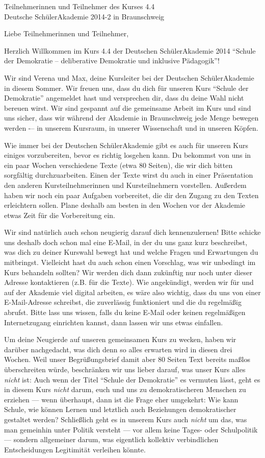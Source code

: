 \documentclass[a4paper]{letter}
\date{15.\ April 2014}
\begin{document}
\begin{letter}{
	Teilnehmerinnen und Teilnehmer des Kurses 4.4 \\
	Deutsche SchülerAkademie 2014-2 in Braunschweig}

\opening{Liebe Teilnehmerinnen und Teilnehmer,}

Herzlich Willkommen im Kurs 4.4 der Deutschen SchülerAkademie 2014 ``Schule der Demokratie -- deliberative Demokratie und inklusive Pädagogik''!

Wir sind Verena und Max, deine Kursleiter bei der Deutschen SchülerAkademie in diesem Sommer.
Wir freuen uns, dass du dich für unseren Kurs ``Schule der Demokratie'' angemeldet hast und versprechen dir, dass du deine Wahl nicht bereuen wirst.
Wir sind gespannt auf die gemeinsame Arbeit im Kurs und sind uns sicher, dass wir während der Akademie in Braunschweig jede Menge bewegen werden  -– in unserem Kursraum, in unserer Wissenschaft und in unseren Köpfen.

Wie immer bei der Deutschen SchülerAkademie gibt es auch für unseren Kurs einiges vorzubereiten, bevor es richtig losgehen kann.
Du bekommst von uns in ein paar Wochen verschiedene Texte (etwa 80 Seiten), die wir dich bitten sorgfältig durchzuarbeiten.
Einen der Texte wirst du auch in einer Präsentation den anderen Kursteilnehmerinnen und Kursteilnehmern vorstellen.
Außerdem haben wir noch ein paar Aufgaben vorbereitet, die dir den Zugang zu den Texten erleichtern sollen.
Plane deshalb am besten in den Wochen vor der Akademie etwas Zeit für die Vorbereitung ein.

Wir sind natürlich auch schon neugierig darauf dich kennenzulernen!
Bitte schicke uns deshalb doch schon mal eine E-Mail, in der du uns ganz kurz beschreibst, was dich zu deiner Kurswahl bewegt hat und welche Fragen und Erwartungen du mitbringst.
Vielleicht hast du auch schon einen Vorschlag, was wir unbedingt im Kurs behandeln sollten?
Wir werden dich dann zukünftig nur noch unter dieser Adresse kontaktieren (z.B. für die Texte).
Wie angekündigt, werden wir für und auf der Akademie viel digital arbeiten, es wäre also wichtig, dass du uns von einer E-Mail-Adresse schreibst, die zuverlässig funktioniert und die du regelmäßig abrufst.
Bitte lass uns wissen, falls du keine E-Mail oder keinen regelmäßigen Internetzugang einrichten kannst, dann lassen wir uns etwas einfallen.

Um deine Neugierde auf unseren gemeinsamen Kurs zu wecken, haben wir darüber nachgedacht, was dich denn so alles erwarten wird in diesen drei Wochen.
Weil unser Begrüßungsbrief damit aber 80 Seiten Text bereits maßlos überschreiten würde, beschränken wir uns lieber darauf, was unser Kurs alles \emph{nicht} ist:
Auch wenn der Titel ``Schule der Demokratie'' es vermuten lässt, geht es in diesem Kurs \emph{nicht} darum, euch und uns zu demokratischeren Menschen zu erziehen --- wenn überhaupt, dann ist die Frage eher umgekehrt: Wie kann Schule, wie können Lernen und letztlich auch Beziehungen demokratischer gestaltet werden?
Schließlich geht es in unserem Kurs auch \emph{nicht} um das, was man gemeinhin unter Politik versteht --- vor allem keine Tages- oder Schulpolitik --- sondern allgemeiner darum, was eigentlich kollektiv verbindlichen Entscheidungen Legitimität verleihen könnte.


\end{letter}
\end{document}
